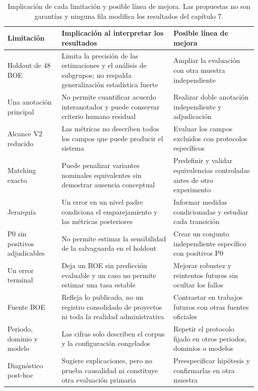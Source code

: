 \begin{table}[p]
\centering
\footnotesize
\renewcommand{\arraystretch}{1.16}
\begin{tabular}{L{3.0cm} L{5.0cm} L{4.6cm}}
\hline
Limitación & Implicación al interpretar los resultados & Posible línea de mejora \\
\hline
Holdout de 48 BOE & Limita la precisión de las estimaciones y el análisis de subgrupos; no respalda generalización estadística fuerte & Ampliar la evaluación con otra muestra independiente \\
Una anotación principal & No permite cuantificar acuerdo interanotador y puede conservar criterio humano residual & Realizar doble anotación independiente y adjudicación \\
Alcance V2 reducido & Las métricas no describen todos los campos que puede producir el sistema & Evaluar los campos excluidos con protocolos específicos \\
Matching exacto & Puede penalizar variantes nominales equivalentes sin demostrar ausencia conceptual & Predefinir y validar equivalencias controladas antes de otro experimento \\
Jerarquía & Un error en un nivel padre condiciona el emparejamiento y las métricas posteriores & Informar medidas condicionadas y estudiar cada transición \\
P0 sin positivos adjudicables & No permite estimar la sensibilidad de la salvaguarda en el holdout & Crear un conjunto independiente específico con positivos P0 \\
Un error terminal & Deja un BOE sin predicción evaluable y un caso no permite estimar una tasa estable & Mejorar robustez y reintentos futuros sin ocultar los fallos \\
Fuente BOE & Refleja lo publicado, no un registro consolidado de proyectos ni toda la realidad administrativa & Contrastar en trabajos futuros con otras fuentes oficiales \\
Periodo, dominio y modelo & Las cifras solo describen el corpus y la configuración congelados & Repetir el protocolo fijado en otros periodos, dominios o modelos \\
Diagnóstico post-hoc & Sugiere explicaciones, pero no prueba causalidad ni constituye otra evaluación primaria & Preespecificar hipótesis y confirmarlas en otra muestra \\
\hline
\end{tabular}
\caption[Principales limitaciones]{Implicación de cada limitación y posible
línea de mejora. Las propuestas no son garantías y ninguna fila modifica los
resultados del capítulo 7.}
\label{tab:limitaciones-discusion}
\end{table}

